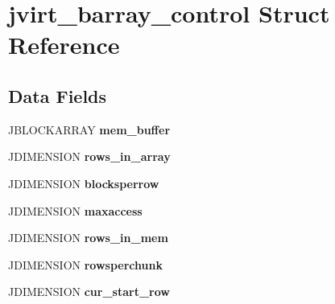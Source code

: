 \hypertarget{structjvirt__barray__control}{}\section{jvirt\+\_\+barray\+\_\+control Struct Reference}
\label{structjvirt__barray__control}
\subsection*{Data Fields}
\begin{DoxyCompactItemize}
\item 
\mbox{\label{structjvirt__barray__control_aeb0e47abe093cc4e3ad5c07f17b54f16}} 
J\+B\+L\+O\+C\+K\+A\+R\+R\+AY {\bfseries mem\+\_\+buffer}
\item 
\mbox{\label{structjvirt__barray__control_a48dd96e369ff5366a4786d7d2a9e32aa}} 
J\+D\+I\+M\+E\+N\+S\+I\+ON {\bfseries rows\+\_\+in\+\_\+array}
\item 
\mbox{\label{structjvirt__barray__control_ae4188db44a251aba480f6ae1c13750d3}} 
J\+D\+I\+M\+E\+N\+S\+I\+ON {\bfseries blocksperrow}
\item 
\mbox{\label{structjvirt__barray__control_ac9f087e8d0dc706f4ce2c558dfbe820b}} 
J\+D\+I\+M\+E\+N\+S\+I\+ON {\bfseries maxaccess}
\item 
\mbox{\label{structjvirt__barray__control_a72c5563978cef0ed93381c1c97e185e0}} 
J\+D\+I\+M\+E\+N\+S\+I\+ON {\bfseries rows\+\_\+in\+\_\+mem}
\item 
\mbox{\label{structjvirt__barray__control_af0c604d6fa92d9ef5712dac1e009b373}} 
J\+D\+I\+M\+E\+N\+S\+I\+ON {\bfseries rowsperchunk}
\item 
\mbox{\label{structjvirt__barray__control_ab4f81df1ac15f204650f12feffe0738c}} 
J\+D\+I\+M\+E\+N\+S\+I\+ON {\bfseries cur\+\_\+start\+\_\+row}
\item 
\mbox{\label{structjvirt__barray__control_aee6ff0d2698bfaabc9a6782020beccb1}} 

\end{DoxyCompactItemize}
